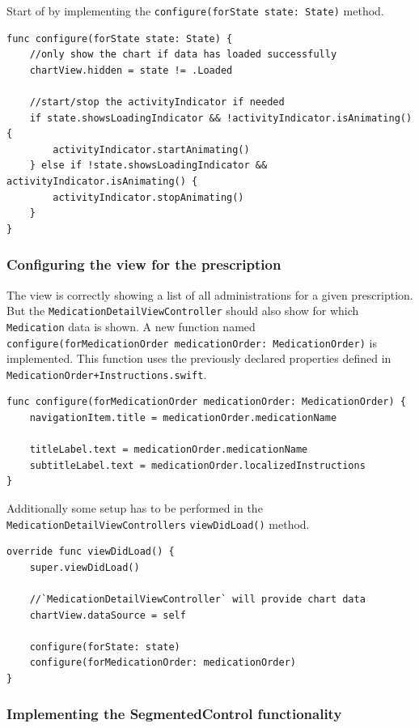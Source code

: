 \documentclass{article}
\begin{document}
Start of by implementing the \texttt{configure(forState\ state:\ State)}
method.

\begin{verbatim}
func configure(forState state: State) {
    //only show the chart if data has loaded successfully
    chartView.hidden = state != .Loaded

    //start/stop the activityIndicator if needed
    if state.showsLoadingIndicator && !activityIndicator.isAnimating() {
        activityIndicator.startAnimating()
    } else if !state.showsLoadingIndicator && activityIndicator.isAnimating() {
        activityIndicator.stopAnimating()
    }
}
\end{verbatim}

\subsubsection{Configuring the view for the prescription}\label{configuring-the-view-for-the-prescription}

The view is correctly showing a list of all administrations for a given
prescription. But the \texttt{MedicationDetailViewController} should
also show for which \texttt{Medication} data is shown. A new function
named
\texttt{configure(forMedicationOrder\ medicationOrder:\ MedicationOrder)}
is implemented. This function uses the previously declared properties
defined in \texttt{MedicationOrder+Instructions.swift}.

\begin{verbatim}
func configure(forMedicationOrder medicationOrder: MedicationOrder) {
    navigationItem.title = medicationOrder.medicationName

    titleLabel.text = medicationOrder.medicationName
    subtitleLabel.text = medicationOrder.localizedInstructions
}
\end{verbatim}

Additionally some setup has to be performed in the
\texttt{MedicationDetailViewControllers} \texttt{viewDidLoad()} method.

\begin{verbatim}
override func viewDidLoad() {
    super.viewDidLoad()

    //`MedicationDetailViewController` will provide chart data
    chartView.dataSource = self

    configure(forState: state)
    configure(forMedicationOrder: medicationOrder)
}
\end{verbatim}

\subsubsection{Implementing the SegmentedControl functionality}\label{implementing-the-segmentedcontrol-functionality}
\end{document}

